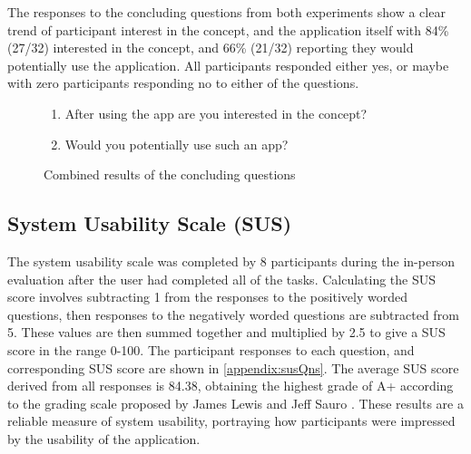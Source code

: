 The responses to the concluding questions from both experiments show a clear trend of participant interest in the concept, and the application itself with 84\% (27/32) interested in the concept, and 66\% (21/32) reporting they would potentially use the application. All participants responded either yes, or maybe with zero participants responding no to either of the questions.

\begin{figure}[H]

\begin{enumerate}
    \item After using the app are you interested in the concept?
    \item Would you potentially use such an app?
\end{enumerate}
\caption{Combined results of the concluding questions}
\label{fig:conclAns}
\end{figure}
\FloatBarrier

\subsection{System Usability Scale (SUS)}
The system usability scale was completed by 8 participants during the in-person evaluation after the user had completed all of the tasks. Calculating the SUS score involves subtracting 1 from the responses to the positively worded questions, then responses to the negatively worded questions are subtracted from 5. These values are then summed together and multiplied by 2.5 to give a SUS score in the range 0-100. The participant responses to each question, and corresponding SUS score are shown in \ref{appendix:susQns}. The average SUS score derived from all responses is 84.38, obtaining the highest grade of A+ according to the grading scale proposed by James Lewis and Jeff Sauro \cite{susGrades}. These results are a reliable measure of system usability, portraying how participants were impressed by the usability of the application.

